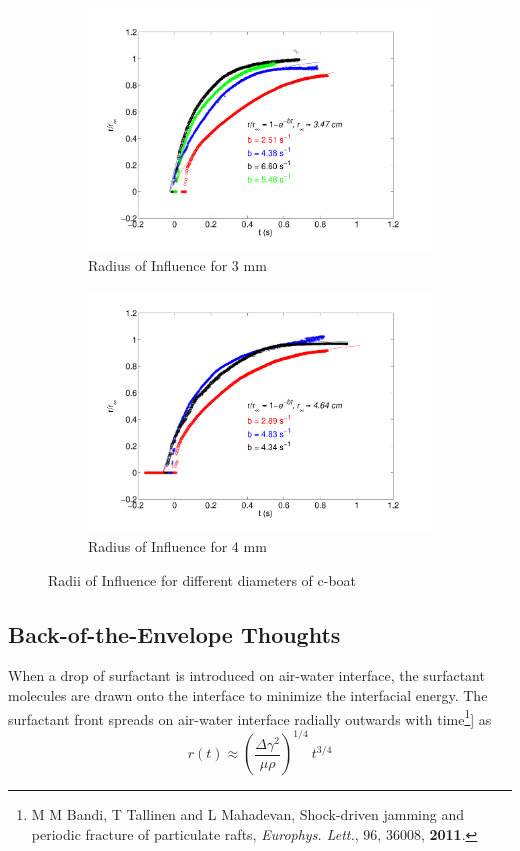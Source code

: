 \documentclass[12pt]{article}
\begin{document}
\begin{figure}[h]
\begin{subfigure}[h]{0.5\textwidth}
       \includegraphics[scale=0.3]{roi_3mm_250mm.pdf}
       \caption{Radius of Influence for 3 mm}
       \label{fig:roi3mm}
	\end{subfigure}
	\hfill
	\begin{subfigure}[h]{0.5\textwidth}
    \centering
       \includegraphics[scale=0.3]{roi_4mm_250mm.pdf}
       \caption{Radius of Influence for 4 mm}
       \label{fig:roi4mm}
	\end{subfigure}
	\caption{Radii of Influence for different diameters of c-boat}
	\label{fig:roiAll}
\end{figure}

\subsection{Back-of-the-Envelope Thoughts}
When a drop of surfactant is introduced on air-water interface, the surfactant molecules are drawn onto the interface to minimize the interfacial energy. The surfactant front spreads on air-water interface radially outwards with time\footnote{M M Bandi, T Tallinen and L Mahadevan, Shock-driven jamming and periodic fracture of particulate rafts, \emph{Europhys. Lett.}, 96, 36008, {\bf 2011}.}] as 
\begin{equation}\label{eq:rnosub}
r(t) \approx \left(\frac{\Delta \gamma^{2}}{\mu \rho}\right)^{1/4}\ t^{3/4}
\end{equation}
\end{document}
